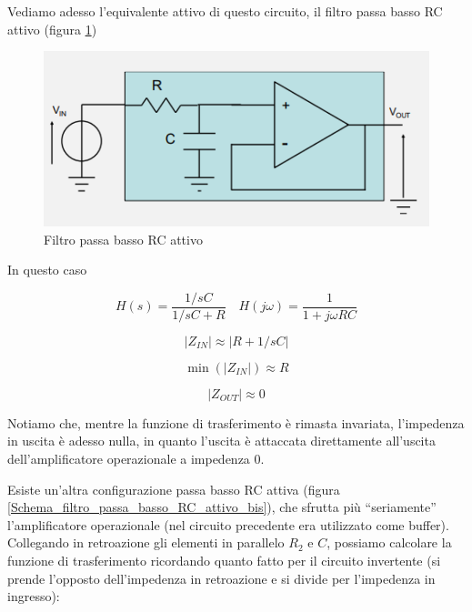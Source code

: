 \documentclass{article}
\begin{document}
\vspace{3mm}

Vediamo adesso l'equivalente attivo di questo circuito, il filtro passa basso RC attivo (figura \ref{Schema_filtro_passa_basso_RC_attivo})

\begin{figure}[h]
  \centering
  \includegraphics[scale=0.7]{IM_filtro_passa_basso_RC_attivo}
  \caption{Filtro passa basso RC attivo}
  \label{Schema_filtro_passa_basso_RC_attivo}
\end{figure}

In questo caso 

\[H(s) = \frac{1/sC}{1/sC + R} \quad H(j \omega) = \frac{1}{1 + j \omega RC}\]

\[|Z_{IN}| \approx |R + 1/sC|\]

\[\min(|Z_{IN}|) \approx R\]

\[|Z_{OUT}| \approx 0\]

Notiamo che, mentre la funzione di trasferimento è rimasta invariata, l'impedenza in uscita è adesso nulla, in quanto l'uscita è attaccata direttamente all'uscita dell'amplificatore operazionale a impedenza 0.

\vspace{3mm}

Esiste un'altra configurazione passa basso RC attiva (figura \ref{Schema_filtro_passa_basso_RC_attivo_bis}), che sfrutta più ``seriamente'' l'amplificatore operazionale (nel circuito precedente era utilizzato come buffer). Collegando in retroazione gli elementi in parallelo $R_2$ e $C$, possiamo calcolare la funzione di trasferimento ricordando quanto fatto per il circuito invertente (si prende l'opposto dell'impedenza in retroazione e si divide per l'impedenza in ingresso):
\end{document}
